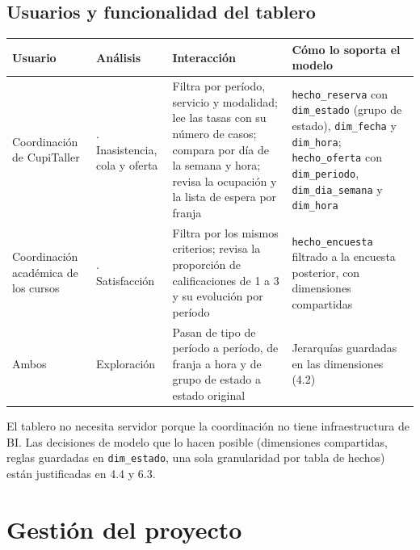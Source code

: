 \documentclass[11pt,letterpaper]{article}
\begin{document}
\subsection{Usuarios y funcionalidad del tablero}

\begingroup\small\setlength{\tabcolsep}{4pt}\renewcommand{\arraystretch}{1.15}
\begin{longtable}{>{\raggedright\arraybackslash}p{}>{\raggedright\arraybackslash}p{}>{\raggedright\arraybackslash}p{}>{\raggedright\arraybackslash}p{}}
\toprule
\textbf{Usuario} & \textbf{Análisis} & \textbf{Interacción} & \textbf{Cómo lo soporta el modelo} \\
\midrule
\endhead
Coordinación de CupiTaller & 1. Inasistencia, cola y oferta & Filtra por período, servicio y modalidad; lee las tasas con su número de casos; compara por día de la semana y hora; revisa la ocupación y la lista de espera por franja & \texttt{hecho\_\allowbreak{}reserva} con \texttt{dim\_\allowbreak{}estado} (grupo de estado), \texttt{dim\_\allowbreak{}fecha} y \texttt{dim\_\allowbreak{}hora}; \texttt{hecho\_\allowbreak{}oferta} con \texttt{dim\_\allowbreak{}periodo}, \texttt{dim\_\allowbreak{}dia\_\allowbreak{}semana} y \texttt{dim\_\allowbreak{}hora} \\
Coordinación académica de los cursos & 2. Satisfacción & Filtra por los mismos criterios; revisa la proporción de calificaciones de 1 a 3 y su evolución por período & \texttt{hecho\_\allowbreak{}encuesta} filtrado a la encuesta posterior, con dimensiones compartidas \\
Ambos & Exploración & Pasan de tipo de período a período, de franja a hora y de grupo de estado a estado original & Jerarquías guardadas en las dimensiones (4.2) \\
\bottomrule
\end{longtable}
\endgroup


El tablero no necesita servidor porque la coordinación no tiene infraestructura de BI. Las decisiones de modelo que lo hacen posible (dimensiones compartidas, reglas guardadas en \texttt{dim\_\allowbreak{}estado}, una sola granularidad por tabla de hechos) están justificadas en 4.4 y 6.3.


\section{Gestión del proyecto}
\end{document}
